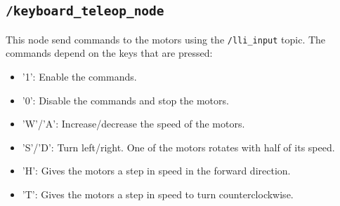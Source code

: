 \subsection*{\lstinline[style=cinline]{/keyboard_teleop_node}}
This node send commands to the motors using the \lstinline[style=cinline]{/lli_input} topic. The commands depend on the keys that are pressed:
\begin{itemize}
    \item '1': Enable the commands.
    \item '0': Disable the commands and stop the motors.
    \item 'W'/'A': Increase/decrease the speed of the motors.
    \item 'S'/'D': Turn left/right. One of the motors rotates with half of its speed.
    \item 'H': Gives the motors a step in speed in the forward direction.
    \item 'T': Gives the motors a step in speed to turn counterclockwise.
\end{itemize}


